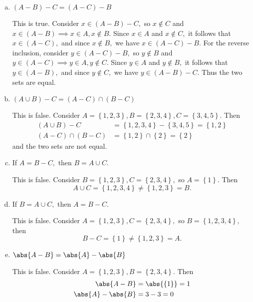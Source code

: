 \documentclass{article}
\begin{document}
\begin{itemize}
\begin{enumerate}[a.]
			\item $(A-B)-C=(A-C)-B$
				\begin{soln}
					This is true. Consider $x\in (A-B)-C,$ so $x\notin C$ and $x\in (A-B)\implies x\in A, x\notin B.$ Since $x\in A$ and $x\notin C,$ it follows that $x\in (A-C),$ and since $x\notin B,$ we have $x\in (A-C)-B.$ For the reverse inclusion, consider $y\in (A-C)-B,$ so $y\notin B$ and $y\in(A-C)\implies y\in A, y\notin C.$ Since $y\in A$ and $y\notin B,$ it follows that $y\in (A-B),$ and since $y\notin C,$ we have $y\in(A-B)-C.$ Thus the two sets are equal.
				\end{soln}

			\item $(A\cup B)-C=(A-C)\cap (B-C)$
				\begin{soln}
					This is false. Consider $A=\left\{ 1, 2, 3 \right\}, B=\left\{ 2, 3, 4 \right\}, C=\left\{ 3, 4, 5 \right\}.$ Then
					\begin{align*}
						(A\cup B)-C &= \left\{ 1, 2, 3, 4 \right\} - \left\{ 3, 4, 5 \right\} = \left\{ 1, 2 \right\} \\
						(A-C)\cap (B-C) &= \left\{ 1, 2 \right\}\cap \left\{ 2 \right\} = \left\{ 2 \right\}
					\end{align*}
					and the two sets are not equal.
				\end{soln}

			\item If $A=B-C,$ then $B=A\cup C.$
				\begin{soln}
					This is false. Consider $B=\left\{ 1, 2, 3 \right\}, C=\left\{ 2, 3, 4 \right\},$ so $A=\left\{ 1 \right\}.$ Then 
					\[A\cup C=\left\{ 1, 2, 3, 4 \right\}\neq \left\{ 1, 2, 3 \right\} = B.\]
				\end{soln}

			\item If $B=A\cup C,$ then $A=B-C.$
				\begin{soln}
					This is false. Consider $A=\left\{ 1, 2, 3 \right\}, C=\left\{ 2, 3, 4 \right\},$ so $B=\left\{ 1, 2, 3, 4 \right\},$ then 
				\[B-C=\left\{ 1 \right\}\neq \left\{ 1, 2, 3 \right\} = A.\]
				\end{soln}

			\item $\abs{A-B}=\abs{A}-\abs{B}$
				\begin{soln}
					This is false. Consider $A=\left\{ 1, 2, 3 \right\}, B=\left\{ 2, 3, 4 \right\}.$ Then
					\begin{align*}
						\abs{A-B} &= \abs{\left\{ 1 \right\}} = 1 \\
						\abs{A}-\abs{B} &= 3 - 3 = 0
					\end{align*}
				\end{soln}


\end{enumerate}
\end{itemize}
\end{document}
